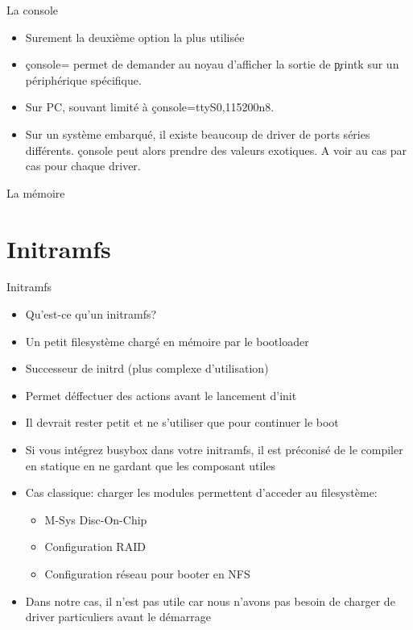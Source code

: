 \begin{frame}[fragile=singleslide]{La console}
  \begin{itemize} 
    \item Surement la deuxième option la plus utilisée
    \item  \c{console=}  permet de  demander  au  noyau d'afficher  la
      sortie de \c{printk} sur un périphérique spécifique.
    \item Sur PC, souvant limité à \c{console=ttyS0,115200n8}.
    \item Sur  un système  embarqué, il existe  beaucoup de  driver de
      ports  séries différents.   \c{console} peut  alors  prendre des
      valeurs exotiques. A voir au cas par cas pour chaque driver.
  \end{itemize} 
\end{frame} 

\begin{frame}[fragile=singleslide]{La mémoire}

\end{frame} 

\section{Initramfs}

\begin{frame}[fragile=singleslide]{Initramfs}
  \begin{itemize}
  \item Qu'est-ce qu'un initramfs?
  \item Un petit filesystème chargé en mémoire par le bootloader
  \item Successeur de initrd (plus complexe d'utilisation)
  \item Permet déffectuer des actions avant le lancement d'init
  \item Il devrait rester petit et ne s'utiliser que pour continuer le
    boot
  \item  Si  vous  intégrez  busybox  dans  votre  initramfs,  il  est
    préconisé  de  le compiler  en  statique  en  ne gardant  que  les
    composant utiles
  \item  Cas classique:  charger les  modules permettent  d'acceder au
    filesystème:
    \begin{itemize}
    \item M-Sys Disc-On-Chip
    \item Configuration RAID
    \item Configuration réseau pour booter en NFS
    \end{itemize}
  \item Dans notre cas, il n'est pas utile car nous n'avons pas besoin
    de charger de driver particuliers avant le démarrage
  \end{itemize}
\end{frame}  

